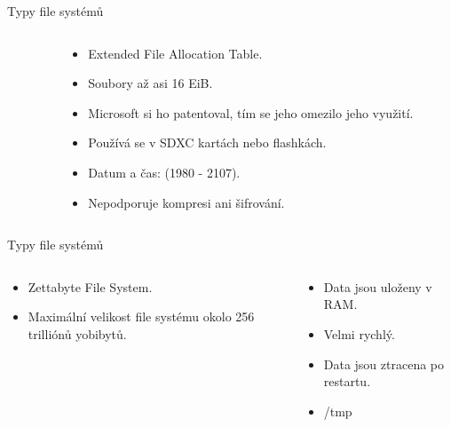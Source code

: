 \documentclass[aspectratio=169,xcolor=dvipsnames, t]{beamer}
\begin{document}
{\begin{frame}{Typy file systémů}
\begin{columns}
\begin{column}{0.45\textwidth}
\begin{itemize}
        \end{itemize}
    \end{column}
    \begin{column}{0.45\textwidth}  %
        \begin{itemize}
            \item Extended File Allocation Table.
            \item Soubory až asi 16 EiB.
            \item Microsoft si ho patentoval, tím se jeho omezilo jeho využití.
            \item Používá se v SDXC kartách nebo flashkách.
            \item Datum a čas: (1980 - 2107).
            \item Nepodporuje kompresi ani šifrování.
        \end{itemize}
    \end{column}
    \end{columns}
\end{frame}
\begin{frame}{Typy file systémů}
    \begin{columns}
    \begin{column}{0.45\textwidth}
        \begin{itemize}
            \item Zettabyte File System.
            \item Maximální velikost file systému okolo 256 trilliónů yobibytů.
        \end{itemize}
    \end{column}
    \begin{column}{0.45\textwidth}  %
        \begin{itemize}
            \item Data jsou uloženy v RAM.
            \item Velmi rychlý.
            \item Data jsou ztracena po restartu.
            \item /tmp
        \end{itemize}
    \end{column}
    \end{columns}
\end{frame}
}
\end{document}
